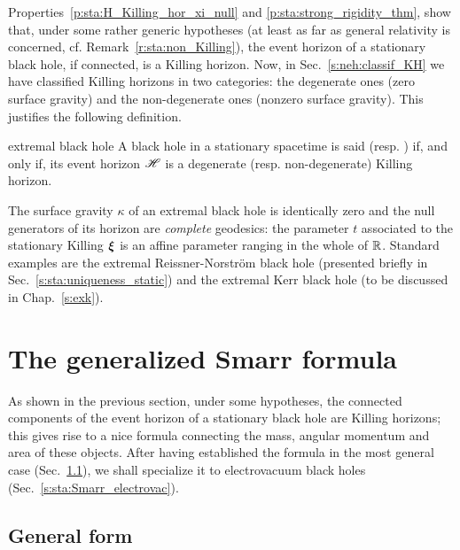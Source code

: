 Properties~\ref{p:sta:H_Killing_hor_xi_null} and \ref{p:sta:strong_rigidity_thm},
show that, under some rather generic hypotheses (at least as far as general
relativity is concerned, cf. Remark~\ref{r:sta:non_Killing}),
the event horizon of a stationary black hole, if connected,
is a Killing horizon. Now, in Sec.~\ref{s:neh:classif_KH}
we have classified Killing horizons in two
categories: the degenerate ones
(zero surface gravity) and the non-degenerate ones
(nonzero surface gravity). This justifies the
following definition.

\begin{tdef}{extremal black hole}{}
A black hole in a stationary spacetime is said  (resp. ) if, and
only if, its event horizon $\mathscr{H}$ is a degenerate (resp. non-degenerate) Killing horizon.
\end{tdef}

The surface gravity $\kappa$ of an extremal black hole is identically zero and
the null generators of its horizon are \emph{complete} geodesics: the parameter $t$
associated to the stationary Killing $\bm{\xi}$ is an affine parameter ranging
in the whole of $\mathbb{R}$.
Standard examples are the extremal Reissner-Norström black hole (presented
briefly in Sec.~\ref{s:sta:uniqueness_static}) and
the extremal Kerr black hole (to be discussed in Chap.~\ref{s:exk}).



\section{The generalized Smarr formula} \label{s:sta:Smarr}

As shown in the previous section, under some hypotheses, the connected components of the event horizon of a stationary black hole are Killing horizons; this gives rise to a nice formula connecting the
mass, angular momentum and area of these objects. After having established
the formula in the most general case (Sec.~\ref{s:sta:Smarr_general}),
we shall specialize it to electrovacuum black holes (Sec.~\ref{s:sta:Smarr_electrovac}).

\subsection{General form} \label{s:sta:Smarr_general}

